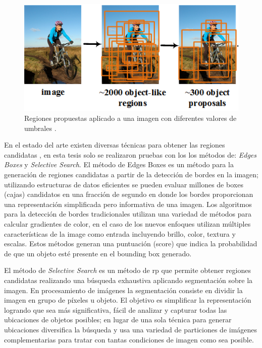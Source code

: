 \begin{figure}[H] \centering
  \includegraphics[scale=0.6,keepaspectratio=true,clip=true]{imagenes/MarcoTeorico/regionProposal.png}
  \caption{Regiones propuestas aplicado a una imagen con diferentes valores de umbrales \citep{regions_proposal_gr}.}
	\label{Fig: propsalregion}
\end{figure}

En el estado del arte existen diversas técnicas para obtener las regiones candidatas \citep{proposal}, en esta tesis  solo se realizaron pruebas con los  los métodos de: \textit{Edges Boxes} y \textit{Selective Search}. El método de Edges Boxes  \citep{edges} es un método para la generación de regiones candidatas a partir de la detección de bordes en la imagen; utilizando estructuras de datos eficientes se pueden evaluar millones de boxes (cajas) candidatos en una fracción de segundo en donde los bordes proporcionan una representación simplificada pero informativa de una imagen. Los algoritmos para la detección de bordes tradicionales utilizan una variedad de métodos para calcular gradientes de color, en el caso de los nuevos enfoques utilizan múltiples características de la image como entrada incluyendo brillo, color, textura y escalas. Estos métodos generan una puntuación (score) que indica la probabilidad de que un objeto esté presente en el bounding box generado.

El método de \textit{Selective Search} \citep{selectivesearch} es un método de \ac{rp} que  permite obtener regiones candidatas realizando una búsqueda exhaustiva aplicando segmentación sobre la imagen. En procesamiento de imágenes la segmentación consiste en dividir la imagen en grupo de píxeles u objeto. El objetivo es simplificar la representación logrando que sea más significativa, fácil de analizar y capturar todas las ubicaciones de objetos posibles; en lugar de una sola técnica para generar ubicaciones diversifica la  búsqueda y usa  una variedad de particiones de imágenes complementarias para tratar con tantas condiciones de imagen como sea posible.

